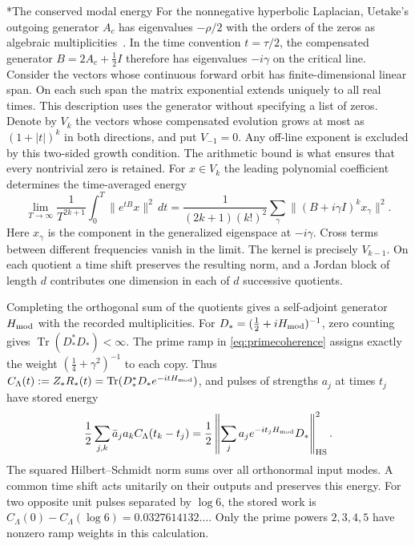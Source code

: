 \documentclass[11pt,letterpaper]{article}
\makeatletter
\renewcommand\subsection{\@startsection{subsection}{2}{\z@}{-2.0ex plus -.3ex}{.75ex}{\normalfont\normalsize\itshape}}
\newcommand{\Tr}{\operatorname{Tr}}
\numberwithin{equation}{section}
\makeatother
\begin{document}
\subsection*{The conserved modal energy}
For the nonnegative hyperbolic Laplacian, Uetake's outgoing generator $A_c$ has eigenvalues $-\rho/2$ with the orders of the zeros as algebraic multiplicities~\cite{uetake}. In the time convention $t=\tau/2$, the compensated generator $B=2A_c+\tfrac12 I$ therefore has eigenvalues $-i\gamma$ on the critical line. Consider the vectors whose continuous forward orbit has finite-dimensional linear span. On each such span the matrix exponential extends uniquely to all real times. This description uses the generator without specifying a list of zeros. Denote by $V_k$ the vectors whose compensated evolution grows at most as $(1+|t|)^k$ in both directions, and put $V_{-1}=0$. Any off-line exponent is excluded by this two-sided growth condition. The arithmetic bound is what ensures that every nontrivial zero is retained. For $x\in V_k$ the leading polynomial coefficient determines the time-averaged energy
\[
 \lim_{T\to\infty}\frac{1}{T^{2k+1}}\int_0^T\|e^{tB}x\|^2\,dt
 =\frac{1}{(2k+1)(k!)^2}\sum_\gamma
          \|(B+i\gamma I)^k x_\gamma\|^2 .
\]
Here $x_\gamma$ is the component in the generalized eigenspace at $-i\gamma$. Cross terms between different frequencies vanish in the limit. The kernel is precisely $V_{k-1}$. On each quotient a time shift preserves the resulting norm, and a Jordan block of length $d$ contributes one dimension in each of $d$ successive quotients.

Completing the orthogonal sum of the quotients gives a self-adjoint generator $H_{\rm mod}$ with the recorded multiplicities. For $D_*=(\tfrac12+iH_{\rm mod})^{-1}$, zero counting gives $\Tr(D_*^*D_*)<\infty$. The prime ramp in \eqref{eq:primecoherence} assigns exactly the weight $(\tfrac14+\gamma^2)^{-1}$ to each copy. Thus $C_\Lambda(t):=Z_*R_*(t)=\Tr(D_*^*D_* e^{-itH_{\rm mod}})$, and pulses of strengths $a_j$ at times $t_j$ have stored energy
\[
 \frac12\sum_{j,k}\bar a_j a_k C_\Lambda(t_k-t_j)
 =\frac12\left\|\sum_j a_j e^{-it_jH_{\rm mod}}D_*\right\|_{\rm HS}^2 .
\]
The squared Hilbert--Schmidt norm sums over all orthonormal input modes. A common time shift acts unitarily on their outputs and preserves this energy. For two opposite unit pulses separated by $\log 6$, the stored work is $C_\Lambda(0)-C_\Lambda(\log 6)=0.0327614132\ldots$. Only the prime powers $2,3,4,5$ have nonzero ramp weights in this calculation.
\end{document}
